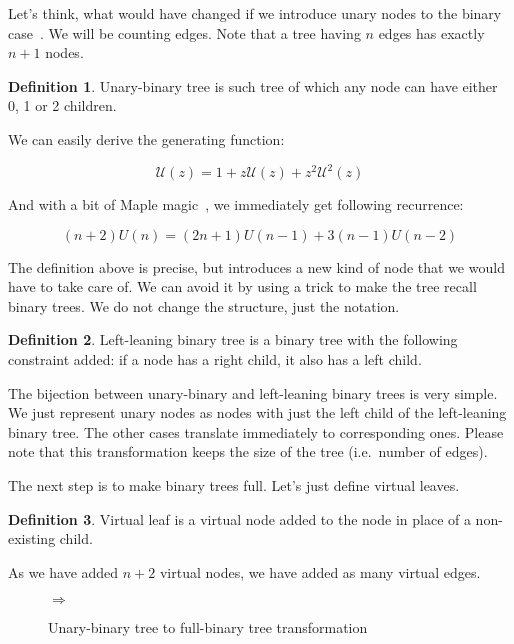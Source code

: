 \documentclass[final]{article}
\theoremstyle{definition}
\newtheorem{definition}{Definition}[subsection]
\theoremstyle{remark}
\newcommand{\gf}[1]{\ensuremath{\mathcal{#1}}}
\newcommand{\includeinlinesvg}[2]{\begin{minipage}{#1\textwidth}\end{minipage}}
\begin{document}
Let's think, what would have changed if we introduce unary nodes to the binary case~\cite{motzkin}. We will be counting edges. Note that a tree having \(n\) edges has exactly \(n + 1\) nodes.

\begin{definition}
    Unary-binary tree is such tree of which any node can have either 0, 1 or 2 children.
\end{definition}

We can easily derive the generating function:

\[\gf{U}(z) = 1 + z\gf{U}(z) + z^2 \gf{U}^2(z)\]

And with a bit of Maple magic~\cite{gfun}, we immediately get following recurrence:

\[(n + 2)U(n) = (2n + 1)U(n - 1) + 3(n - 1)U(n - 2)\]

The definition above is precise, but introduces a new kind of node that we would have to take care of. We can avoid it by using a trick to make the tree recall binary trees. We do not change the structure, just the notation.

\begin{definition}
    \label{def:unary_binary_2}
    Left-leaning binary tree is a binary tree with the following constraint added: if a node has a right child, it also has a left child.
\end{definition}

The bijection between unary-binary and left-leaning binary trees is very simple. We just represent unary nodes as nodes with just the left child of the left-leaning binary tree. The other cases translate immediately to corresponding ones. Please note that this transformation keeps the size of the tree (i.e.~number of edges).

The next step is to make binary trees full. Let's just define virtual leaves.

\begin{definition}
    Virtual leaf is a virtual node added to the node in place of a non-existing child.
\end{definition}

As we have added \(n + 2\) virtual nodes, we have added as many virtual edges.

\begin{figure}[H]
    \centering
    \includeinlinesvg{.2}{unary_binary__base}%
    \(\Rightarrow\)%
    \includeinlinesvg{.3}{unary_binary__full}
    \caption{Unary-binary tree to full-binary tree transformation}
    \label{fig:unary_binary_transformation}
\end{figure}
\end{document}
